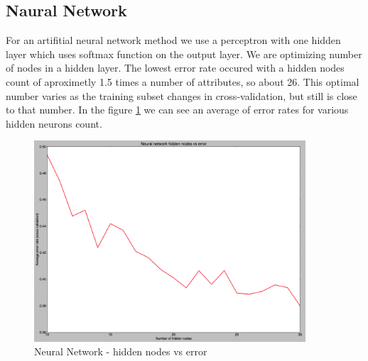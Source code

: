 \subsection{Naural Network}
For an artifitial neural network method we use a perceptron with one hidden layer which uses softmax function
on the output layer. We are optimizing number of nodes in a hidden layer. The lowest error rate occured with a
hidden nodes count of aproximetly 1.5 times a number of attributes, so about 26. This optimal number varies 
as the training subset changes in cross-validation, but still is close to that number. In the figure \ref{fig:NN_hiddennodes} 
we can see an average of error rates for various hidden neurons count.
\begin{figure}[!tbh]
	\centering
	\includegraphics[width=0.9\textwidth]{figures/NN_hiddennodes}
	\caption{Neural Network - hidden nodes vs error}
	\label{fig:NN_hiddennodes}
\end{figure}
